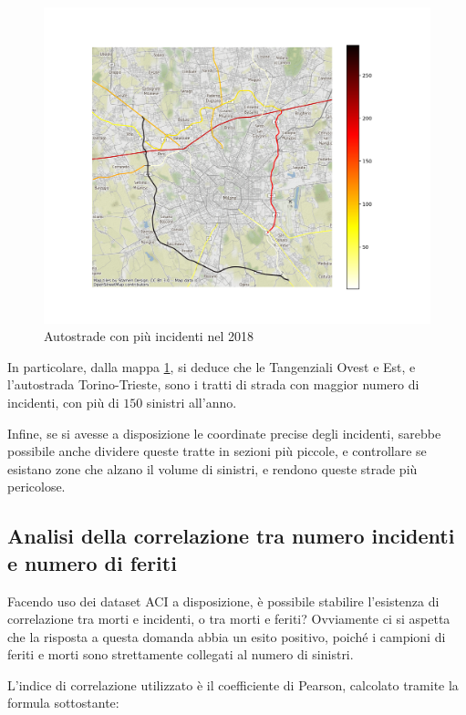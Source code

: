 \documentclass[a4paper,12pt]{report}
\begin{document}
\begin{figure}
    \includegraphics[width=\linewidth]{../src/incidenti/incidenti_aci/autostrade/incidenti_line_chart.png}
    \caption{Autostrade con più incidenti nel 2018}
    \label{fig:line-incidenti-milano}
\end{figure}

In particolare, dalla mappa \ref{fig:line-incidenti-milano}, si deduce che le 
Tangenziali Ovest e Est, e l'autostrada Torino-Trieste, sono i tratti di 
strada con maggior numero di incidenti, con più di $150$ sinistri all'anno. 

Infine, se si avesse a disposizione le coordinate precise degli incidenti, 
sarebbe possibile anche dividere queste tratte in sezioni più piccole, 
e controllare se esistano zone che alzano il volume di sinistri, e rendono queste strade 
più pericolose. 

\subsection{Analisi della correlazione tra numero incidenti e numero di feriti}

Facendo uso dei dataset ACI a disposizione, è possibile stabilire l'esistenza di 
correlazione tra morti e incidenti, o tra morti e feriti?
Ovviamente ci si aspetta che la risposta a questa domanda abbia un 
esito positivo, poiché 
i campioni di feriti e morti sono strettamente collegati al numero di sinistri. 

L'indice di correlazione utilizzato è il coefficiente di Pearson, 
calcolato tramite la formula sottostante: 
\end{document}
